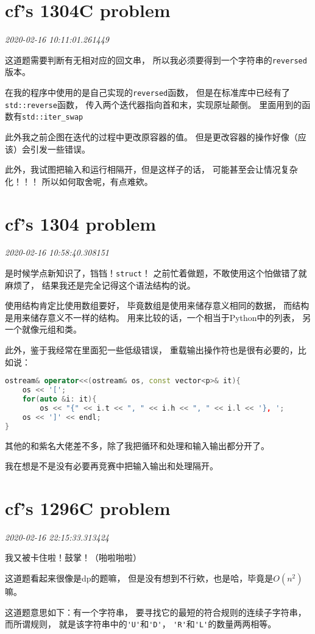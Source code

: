 \documentclass{peterlitsdoc}
\newcommand{\timetx}[1]
    {\par\noindent\emph{\pltgray\small #1}\vspace{2em}}
\newcommand{\vb}{\verb}
\begin{document}
\section{cf's 1304C problem}\timetx{2020-02-16 10:11:01.261449}

这道题需要判断有无相对应的回文串，
所以我必须要得到一个字符串的\vb|reversed|版本。

在我的程序中使用的是自己实现的\vb|reversed|函数，
但是在标准库中已经有了\vb|std::reverse|函数，
传入两个迭代器指向首和末，实现原址颠倒。
里面用到的函数有\vb|std::iter_swap|

此外我之前企图在迭代的过程中更改原容器的值。
但是更改容器的操作好像（应该）会引发一些错误。

此外，我试图把输入和运行相隔开，但是这样子的话，
可能甚至会让情况复杂化！！！
所以如何取舍呢，有点难欸。


\section{cf's 1304 problem}\timetx{2020-02-16 10:58:40.308151}

是时候学点新知识了，铛铛！\vb|struct|！
之前忙着做题，不敢使用这个怕做错了就麻烦了，
结果我还是完全记得这个语法结构的说。

使用结构肯定比使用数组要好，
毕竟数组是使用来储存意义相同的数据，
而结构是用来储存意义不一样的结构。
用来比较的话，一个相当于Python中的列表，
另一个就像元组和类。

此外，鉴于我经常在里面犯一些低级错误，
重载输出操作符也是很有必要的，比如说：
\begin{lstlisting}[language=C++]
ostream& operator<<(ostream& os, const vector<p>& it){
    os << '[';
    for(auto &i: it){
        os << "{" << i.t << ", " << i.h << ", " << i.l << '}, ';
    os << ']' << endl;
}
\end{lstlisting}

其他的和紫名大佬差不多，除了我把循环和处理和输入输出都分开了。

我在想是不是没有必要再竞赛中把输入输出和处理隔开。


\section{cf's 1296C problem}\timetx{2020-02-16 22:15:33.313424}

我又被卡住啦！鼓掌！（啪啦啪啦）

这道题看起来很像是dp的题嘛，
但是没有想到不行欸，也是哈，毕竟是$O(n^2)$嘛。

这道题意思如下：有一个字符串，
要寻找它的最短的符合规则的连续子字符串，
而所谓规则，
就是该字符串中的\vb|'U'|和\vb|'D'|，
\vb|'R'|和\vb|'L'|的数量两两相等。
\end{document}
